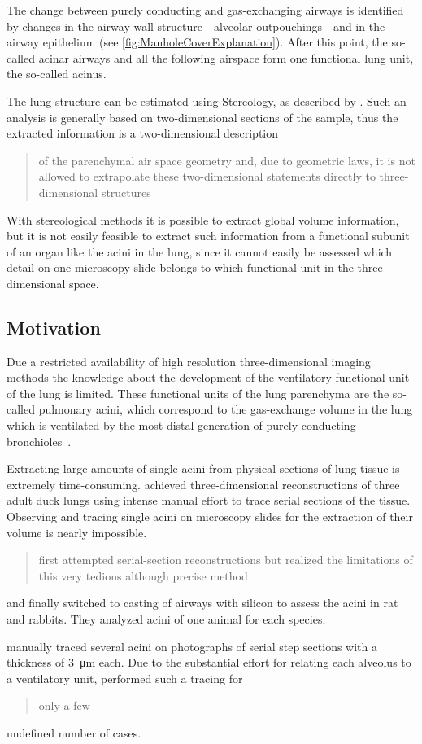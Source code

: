 \documentclass[a4paper,DIVcalc,abstract,english]{scrartcl}
\begin{document}
The change between purely conducting and gas-exchanging airways is identified by changes in the airway wall structure---alveolar outpouchings---and in the airway epithelium (see \autoref{fig:ManholeCoverExplanation}).
After this point, the so-called acinar airways and all the following airspace form one functional lung unit, the so-called acinus.

The lung structure can be estimated using Stereology, as described by \citet{Hsia2010}.
Such an analysis is generally based on two-dimensional sections of the sample, thus the extracted information is a two-dimensional description \blockquote[\citet{Tschanz2002}]{of the parenchymal air space geometry and, due to geometric laws, it is not allowed to extrapolate these two-dimensional statements directly to three-dimensional structures}.
With stereological methods it is possible to extract global volume information, but it is not easily feasible to extract such information from a functional subunit of an organ like the acini in the lung, since it cannot easily be assessed which detail on one microscopy slide belongs to which functional unit in the three-dimensional space.

\subsection{Motivation}
Due a restricted availability of high resolution three-dimensional imaging methods the knowledge about the development of the ventilatory functional unit of the lung is limited.
These functional units of the lung parenchyma are the so-called pulmonary acini, which correspond to the gas-exchange volume in the lung which is ventilated by the most distal generation of purely conducting bronchioles~\cite{Rodriguez1987}.

Extracting large amounts of single acini from physical sections of lung tissue is extremely time-consuming.
\citet{Woodward2005} achieved three-dimensional reconstructions of three adult duck lungs using intense manual effort to trace serial sections of the tissue.
Observing and tracing single acini on microscopy slides for the extraction of their volume is nearly impossible.
\citet{Rodriguez1987} \blockquote{first attempted serial-section reconstructions but realized the limitations of this very tedious although precise method} and finally switched to casting of airways with silicon to assess the acini in rat and rabbits. They analyzed acini of one animal for each species.

\citet{Mercer1987a} manually traced several acini on photographs of serial step sections with a thickness of \SI{3}{\micro\meter} each.
Due to the substantial effort for relating each alveolus to a ventilatory unit, \citeauthor{Mercer1987a} performed such a tracing for \blockquote{only a few} undefined number of cases.
\end{document}
